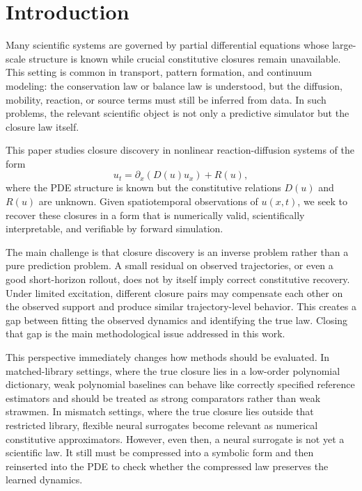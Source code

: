 \section{Introduction}

Many scientific systems are governed by partial differential equations whose large-scale structure is known while crucial constitutive closures remain unavailable. This setting is common in transport, pattern formation, and continuum modeling: the conservation law or balance law is understood, but the diffusion, mobility, reaction, or source terms must still be inferred from data. In such problems, the relevant scientific object is not only a predictive simulator but the closure law itself.

This paper studies closure discovery in nonlinear reaction-diffusion systems of the form
\begin{equation}
u_t = \partial_x \left( D(u) u_x \right) + R(u),
\label{eq:rd_main}
\end{equation}
where the PDE structure is known but the constitutive relations $D(u)$ and $R(u)$ are unknown. Given spatiotemporal observations of $u(x,t)$, we seek to recover these closures in a form that is numerically valid, scientifically interpretable, and verifiable by forward simulation.

The main challenge is that closure discovery is an inverse problem rather than a pure prediction problem. A small residual on observed trajectories, or even a good short-horizon rollout, does not by itself imply correct constitutive recovery. Under limited excitation, different closure pairs may compensate each other on the observed support and produce similar trajectory-level behavior. This creates a gap between fitting the observed dynamics and identifying the true law. Closing that gap is the main methodological issue addressed in this work.

This perspective immediately changes how methods should be evaluated. In matched-library settings, where the true closure lies in a low-order polynomial dictionary, weak polynomial baselines can behave like correctly specified reference estimators and should be treated as strong comparators rather than weak strawmen. In mismatch settings, where the true closure lies outside that restricted library, flexible neural surrogates become relevant as numerical constitutive approximators. However, even then, a neural surrogate is not yet a scientific law. It still must be compressed into a symbolic form and then reinserted into the PDE to check whether the compressed law preserves the learned dynamics.

